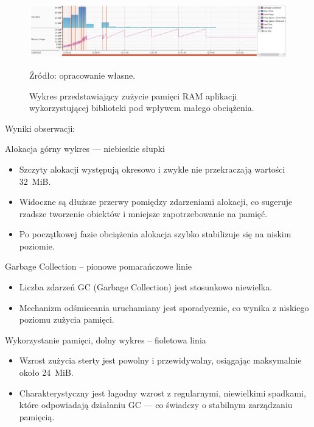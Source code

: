 \documentclass[runningheads,12pt]{llncs}
\begin{document}
\newpage

\begin{figure}
    \includegraphics[width=\linewidth]{images/library-memory-low-graph.jpg}
    \caption{Wykres przedstawiający zużycie pamięci RAM aplikacji wykorzystującej biblioteki pod wpływem małego obciążenia.} \label{fig1}
    \vspace{0.5em}
    {\small Źródło: opracowanie własne.}
\end{figure}

Wyniki obserwacji:

Alokacja górny wykres — niebieskie słupki

\begin{itemize}
  \item Szczyty alokacji występują okresowo i zwykle nie przekraczają wartości 32~MiB.
  \item Widoczne są dłuższe przerwy pomiędzy zdarzeniami alokacji, co sugeruje rzadsze tworzenie obiektów i mniejsze zapotrzebowanie na pamięć.
  \item Po początkowej fazie obciążenia alokacja szybko stabilizuje się na niskim poziomie.
\end{itemize}

Garbage Collection – pionowe pomarańczowe linie

\begin{itemize}
  \item Liczba zdarzeń GC (Garbage Collection) jest stosunkowo niewielka.
  \item Mechanizm odśmiecania uruchamiany jest sporadycznie, co wynika z niskiego poziomu zużycia pamięci.
\end{itemize}

Wykorzystanie pamięci, dolny wykres – fioletowa linia

\begin{itemize}
  \item Wzrost zużycia sterty jest powolny i przewidywalny, osiągając maksymalnie około 24~MiB.
  \item Charakterystyczny jest łagodny wzrost z regularnymi, niewielkimi spadkami, które odpowiadają działaniu GC — co świadczy o stabilnym zarządzaniu pamięcią.
\end{itemize}
\end{document}
